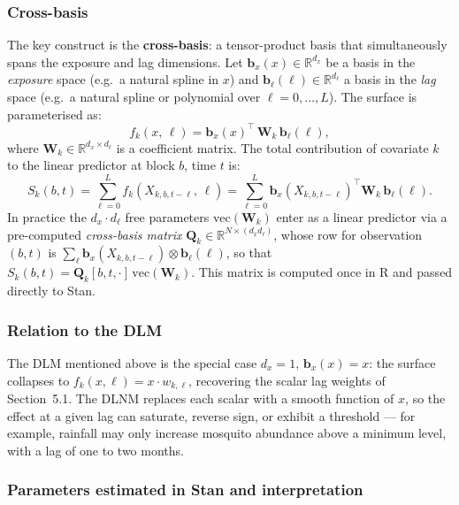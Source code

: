 \documentclass[12pt,a4paper]{article}
\begin{document}
\subsubsection*{Cross-basis}

The key construct is the \textbf{cross-basis}: a tensor-product basis that simultaneously spans the exposure and lag dimensions. Let $\mathbf{b}_x(x) \in \mathbb{R}^{d_x}$ be a basis in the \emph{exposure} space (e.g.\ a natural spline in $x$) and $\mathbf{b}_\ell(\ell) \in \mathbb{R}^{d_\ell}$ a basis in the \emph{lag} space (e.g.\ a natural spline or polynomial over $\ell = 0,\ldots,L$). The surface is parameterised as:
\begin{equation}
  f_k(x,\,\ell) = \mathbf{b}_x(x)^\top\,\mathbf{W}_k\,\mathbf{b}_\ell(\ell),
\end{equation}
where $\mathbf{W}_k \in \mathbb{R}^{d_x \times d_\ell}$ is a coefficient matrix. The total contribution of covariate $k$ to the linear predictor at block $b$, time $t$ is:
\begin{equation}
  S_k(b,t) = \sum_{\ell=0}^{L} f_k\!\left(X_{k,b,t-\ell},\,\ell\right)
           = \sum_{\ell=0}^{L} \mathbf{b}_x\!\left(X_{k,b,t-\ell}\right)^\top \mathbf{W}_k\,\mathbf{b}_\ell(\ell).
\end{equation}
In practice the $d_x \cdot d_\ell$ free parameters $\mathrm{vec}(\mathbf{W}_k)$ enter as a linear predictor via a pre-computed \emph{cross-basis matrix} $\mathbf{Q}_k \in \mathbb{R}^{N \times (d_x d_\ell)}$, whose row for observation $(b,t)$ is $\sum_\ell \mathbf{b}_x(X_{k,b,t-\ell}) \otimes \mathbf{b}_\ell(\ell)$, so that $S_k(b,t) = \mathbf{Q}_k[b,t,\cdot]\,\mathrm{vec}(\mathbf{W}_k)$. This matrix is computed once in R and passed directly to Stan.

\subsubsection*{Relation to the DLM}

The DLM mentioned above is the special case $d_x = 1$, $\mathbf{b}_x(x) = x$: the surface collapses to $f_k(x,\ell) = x \cdot w_{k,\ell}$, recovering the scalar lag weights of Section~5.1. The DLNM replaces each scalar with a smooth function of $x$, so the effect at a given lag can saturate, reverse sign, or exhibit a threshold --- for example, rainfall may only increase mosquito abundance above a minimum level, with a lag of one to two months.

\subsubsection*{Parameters estimated in Stan and interpretation}
\end{document}
